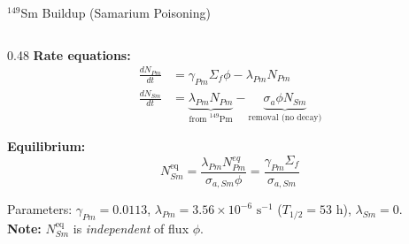 \documentclass[aspectratio=169]{beamer} %
\begin{document}
\begin{frame}{ $^{149}$Sm Buildup (Samarium Poisoning)}
\begin{columns}[T]
        \begin{column}{0.48\textwidth}
            \textbf{Rate equations:}
            \vspace{-0.2cm}
            \begin{align*}
                \frac{dN_{Pm}}{dt} &= \gamma_{Pm} \Sigma_f \phi - \lambda_{Pm} N_{Pm} \\[0.1cm]
                \frac{dN_{Sm}}{dt} &= \underbrace{\lambda_{Pm} N_{Pm}}_{\text{from }^{149}\text{Pm}} - \underbrace{\sigma_a \phi N_{Sm}}_{\text{removal (no decay)}}
            \end{align*}
            
            \vspace{0.1cm}
            \textbf{Equilibrium:}
            \vspace{-0.1cm}
            \begin{equation*}
                N_{Sm}^{\text{eq}} = \frac{\lambda_{Pm} N_{Pm}^{eq}}{\sigma_{a,Sm} \phi} = \frac{\gamma_{Pm} \Sigma_f}{\sigma_{a,Sm}}
            \end{equation*}
            
            \vspace{0.1cm}
            \begin{tcolorbox}[colframe=orange, colback=orange!5, boxrule=0.5pt, arc=2pt, left=1mm, right=1mm, top=1mm, bottom=1mm]
                \scriptsize Parameters: $\gamma_{Pm} = 0.0113$, $\lambda_{Pm} = 3.56 \times 10^{-6} \text{ s}^{-1}$ ($T_{1/2} = 53$ h), $\lambda_{Sm} = 0$. \\
                \textbf{Note:} $N_{Sm}^{\text{eq}}$ is \textit{independent} of flux $\phi$.
            \end{tcolorbox}
        \end{column}
        
    \end{columns}
    
\end{frame}
\end{document}
